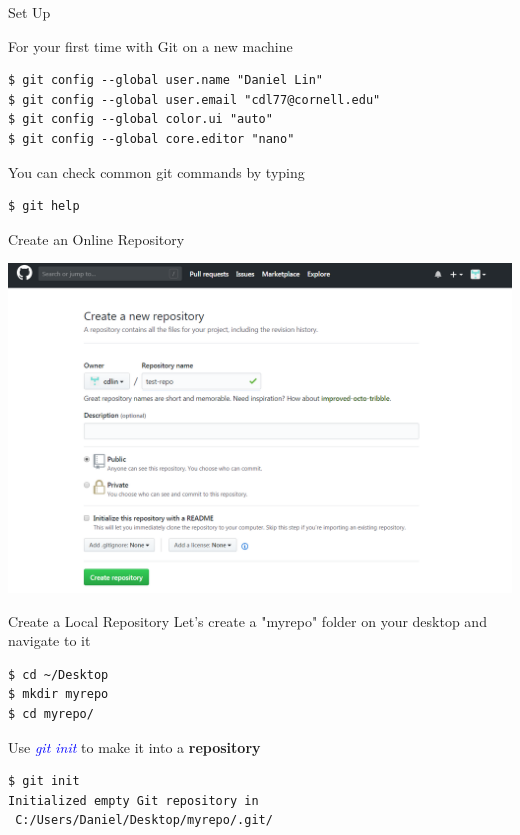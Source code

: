 \documentclass[11pt]{beamer}
\begin{document}
\begin{frame}[fragile]{Set Up}

For your first time with Git on a new machine
\begin{lstlisting}
$ git config --global user.name "Daniel Lin"
$ git config --global user.email "cdl77@cornell.edu"
$ git config --global color.ui "auto"
$ git config --global core.editor "nano"
\end{lstlisting}

You can check common git commands by typing
\begin{lstlisting}
$ git help
\end{lstlisting}
\end{frame}
\begin{frame}[fragile]{Create an Online Repository}
\begin{center}
	\includegraphics[width=1.0\textwidth]{./auxfiles/github_repo.png}
\end{center}
\end{frame}
\begin{frame}[fragile]{Create a Local Repository}
Let's create a "myrepo" folder on your desktop and navigate to it
\begin{lstlisting}
$ cd ~/Desktop
$ mkdir myrepo
$ cd myrepo/
\end{lstlisting}
Use \textcolor{blue}{\emph{git init}} to make it into a \textbf{repository}
\begin{lstlisting}
$ git init
Initialized empty Git repository in
 C:/Users/Daniel/Desktop/myrepo/.git/
\end{lstlisting}
\end{frame}
\end{document}
